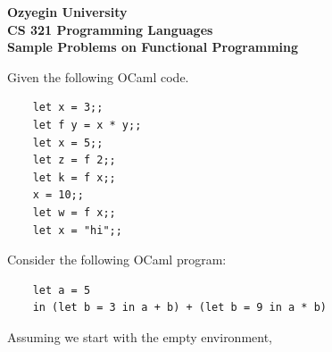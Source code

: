 \documentclass[addpoints]{exam}
\begin{document}
\begin{center}
{\Large \textbf{
    Ozyegin University\\
    CS 321 Programming Languages\\
    Sample Problems on Functional Programming
}}
\end{center}

\begin{questions}
  \question
  Given the following OCaml code.
  \begin{verbatim}
    let x = 3;;
    let f y = x * y;;
    let x = 5;;
    let z = f 2;;
    let k = f x;;
    x = 10;;
    let w = f x;;
    let x = "hi";;
  \end{verbatim}
  


  \question
  Consider the following OCaml program:
  \begin{verbatim}
    let a = 5
    in (let b = 3 in a + b) + (let b = 9 in a * b)
  \end{verbatim}
  Assuming we start with the empty environment,
\end{questions}
\end{document}
